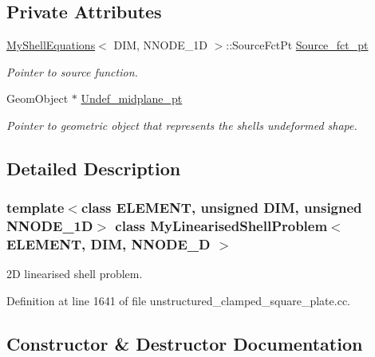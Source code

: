 \subsection*{Private Attributes}
\begin{DoxyCompactItemize}
\item 
\hyperlink{classoomph_1_1MyShellEquations}{My\+Shell\+Equations}$<$ D\+IM, N\+N\+O\+D\+E\+\_\+1D $>$\+::Source\+Fct\+Pt \hyperlink{classMyLinearisedShellProblem_a55fd5e4ce59d478cb41bd8457e868dea}{Source\+\_\+fct\+\_\+pt}
\begin{DoxyCompactList}\small\item\em Pointer to source function. \end{DoxyCompactList}\item 
Geom\+Object $\ast$ \hyperlink{classMyLinearisedShellProblem_a18e84aab4a7fad179e35d381e61c4584}{Undef\+\_\+midplane\+\_\+pt}
\begin{DoxyCompactList}\small\item\em Pointer to geometric object that represents the shell\textquotesingle{}s undeformed shape. \end{DoxyCompactList}\end{DoxyCompactItemize}


\subsection{Detailed Description}
\subsubsection*{template$<$class E\+L\+E\+M\+E\+NT, unsigned D\+IM, unsigned N\+N\+O\+D\+E\+\_\+1D$>$\newline
class My\+Linearised\+Shell\+Problem$<$ E\+L\+E\+M\+E\+N\+T, D\+I\+M, N\+N\+O\+D\+E\+\_\+D $>$}

2D linearised shell problem. 

Definition at line 1641 of file unstructured\+\_\+clamped\+\_\+square\+\_\+plate.\+cc.



\subsection{Constructor \& Destructor Documentation}
\mbox{\label{classMyLinearisedShellProblem_a2ccc4ed3e631ca68d1d86423ef8eeb03}} 
